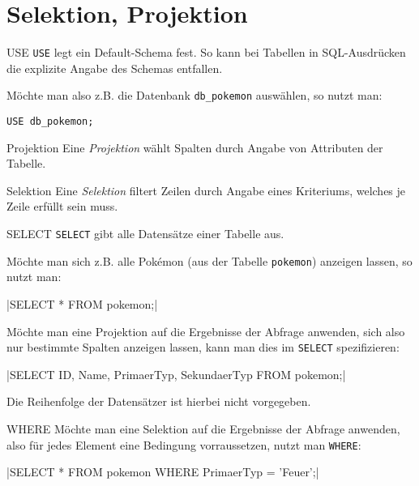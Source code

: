 \section{Selektion, Projektion}

\begin{code}{USE}
    \texttt{USE} legt ein Default-Schema fest.
    So kann bei Tabellen in SQL-Ausdrücken die explizite Angabe des Schemas entfallen.

    Möchte man also z.B. die Datenbank \texttt{db\_pokemon} auswählen, so nutzt man:

    \begin{verbatim}
USE db_pokemon;
    \end{verbatim}
\end{code}

\begin{defi}{Projektion}
    Eine \emph{Projektion} wählt Spalten durch Angabe von Attributen der Tabelle.
\end{defi}

\begin{defi}{Selektion}
    Eine \emph{Selektion} filtert Zeilen durch Angabe eines Kriteriums, welches je Zeile erfüllt sein muss.
\end{defi}

\begin{code}{SELECT}
    \texttt{SELECT} gibt alle Datensätze einer Tabelle aus.

    Möchte man sich z.B. alle Pokémon (aus der Tabelle \texttt{pokemon}) anzeigen lassen, so nutzt man:

    |SELECT * FROM pokemon;|

    

    Möchte man eine Projektion auf die Ergebnisse der Abfrage anwenden, sich also nur bestimmte Spalten anzeigen lassen, kann man dies im \texttt{SELECT} spezifizieren:

    |SELECT ID, Name, PrimaerTyp, SekundaerTyp FROM pokemon;|

    

    Die Reihenfolge der Datensätzer ist hierbei nicht vorgegeben.
\end{code}

\begin{code}{WHERE}
    Möchte man eine Selektion auf die Ergebnisse der Abfrage anwenden, also für jedes Element eine Bedingung vorraussetzen, nutzt man \texttt{WHERE}:

    |SELECT * FROM pokemon WHERE PrimaerTyp = 'Feuer';|

    
\end{code}

